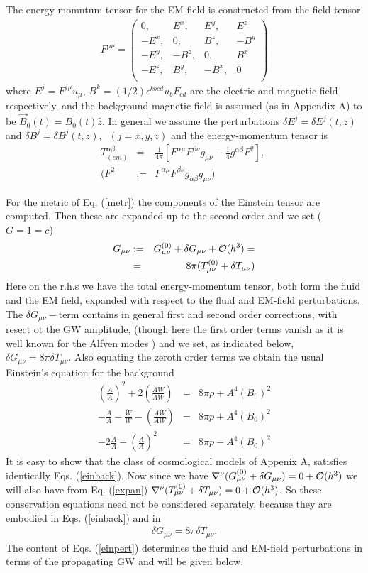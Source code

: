 \documentclass[prd,twocolumn,showpacs,preprintnumbers,amsmath,amssy mb]{revtex4}
\newcommand{\bea}{\begin{eqnarray}}
\newcommand{\eea}{\end{eqnarray}}
\newcommand{\nn}{\nonumber}
\begin{document}
The energy-momntum tensor for the EM-field is constructed 
from the field tensor 
\bea
\label{emten}
F^{\mu \nu }=
\left(
\begin{array}{cccc}
0,    &E^{x}, &E^{y},   &E^{z}\\
-E^{x},    &0,&B^{z},   &-B^{y}\\
-E^{y},    &-B^{z}, &0, &B^{x}\\
-E^{z},    &B^{y},   &-B^{x}, &0\\
\end{array}\right)
\eea
where $E^{j}=F^{j\mu }u_{\mu }$, 
$B^{k}=(1/2)\epsilon ^{kbcd}u_{b}F_{cd}$ are 
the electric and magnetic field respectively, and the 
background magnetic field is assumed (as in Appendix A) 
to be $\vec{B}_{0}(t)=B_{0}(t)\hat{z}$. In general we 
assume the perturbations $\delta E^{j}=\delta E^{j}(t,z)$ 
and $\delta B^{j}=\delta B^{j}(t,z),\; \; (j=x,y,z)$ and 
the energy-momentum tensor is 
\bea
\label{emenerg} 
T^{\alpha \beta }_{(em)}&=&\frac{1}{4\pi }
[F^{\alpha \mu}F^{\beta \nu}g_{\mu \nu }-\frac{1}{4}g^{\alpha \beta }
F^{2}],\; \nn \\ 
(F^{2}&:=&F^{\alpha \mu }F^{\beta \nu}g_{\alpha \beta}g_{\mu \nu})
\eea

For the metric of Eq. (\ref{metr}) the components of the 
Einstein tensor are computed. Then these are expanded up to 
the second order and we set ($G=1=c$)
\bea
\label{expan} 
G_{\mu \nu }&:=&
G_{\mu \nu }^{(0)}+\delta G_{\mu \nu }
+{\cal O}(h^{3})=\nn \\
&=&8\pi (T_{\mu \nu }^{(0)}+\delta T_{\mu \nu })
\eea
Here on the r.h.s we have the total energy-momentum tensor,  
both form the fluid and the EM field, expanded 
with respect to the fluid and EM-field perturbations. The 
$\delta G_{\mu \nu }-$term contains in general 
first and second order corrections, 
with resect ot the GW amplitude, (though here the first 
order terms vanish as it is well known for the Alfven 
modes \cite{pap3})
and we set, as indicated below,\\ 
$\delta G_{\mu \nu }=8\pi \delta T_{\mu \nu }$. Also equating 
the zeroth order terms we obtain the usual Einstein's 
equation for the background 
\bea 
\label{einback}
\left(\frac{\dot{A}}{A}\right)^{2}+
2\left(\frac{\dot{A}\dot{W}}{AW}\right)&=&
8\pi \rho +A^{4}(B_{0})^{2}\nn \\
-\frac{\ddot{A}}{A}-\frac{\ddot{W}}{W}-
\left(\frac{\dot{A}\dot{W}}{AW}\right)&=&
8\pi p+A^{4}(B_{0})^{2}\nn \\
-2\frac{\ddot{A}}{A}-\left(\frac{\dot{A}}{A}\right)^{2}
&=&8\pi p-A^{4}(B_{0})^{2}
\eea
It is easy to show that the class of cosmological 
models of Appenix A, satisfies identically 
Eqs. (\ref{einback}). Now since we have 
$\nabla ^{\nu }(G_{\mu \nu }^{(0)}+\delta G_{\mu \nu })
=0+{\cal O}(h^{3})$ we will also have from Eq. (\ref{expan}) 
$\nabla ^{\nu }(T_{\mu \nu }^{(0)}+\delta T_{\mu \nu })
=0+{\cal O}(h^{3})$. So these conservation equations need 
not be considered separately, because they are embodied in 
Eqs. (\ref{einback}) and in
\bea 
\label{einpert}
\delta G_{\mu \nu }=8\pi \delta T_{\mu \nu }. 
\eea
The content of Eqs. (\ref{einpert}) determines the fluid and 
EM-field perturbations in terms of the propagating GW and 
will be given below.
\end{document}
